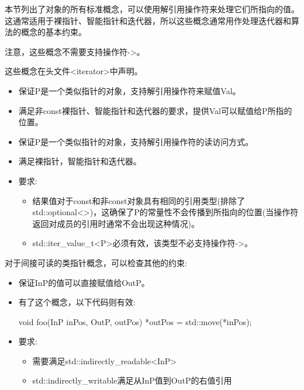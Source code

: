 
本节列出了对象的所有标准概念，可以使用解引用操作符来处理它们所指向的值。这通常适用于裸指针、智能指针和迭代器，所以这些概念通常用作处理迭代器和算法的概念的基本约束。

注意，这些概念不需要支持操作符->。

这些概念在头文件<iterator>中声明。



\begin{itemize}
\item
保证P是一个类似指针的对象，支持解引用操作符来赋值Val。

\item
满足非const裸指针、智能指针和迭代器的要求，提供Val可以赋值给P所指的位置。
\end{itemize}



\begin{itemize}
\item
保证P是一个类似指针的对象，支持解引用操作符的读访问方式。

\item
满足裸指针，智能指针和迭代器。


\item
要求:
\begin{itemize}
\item
结果值对于const和非const对象具有相同的引用类型(排除了std::optional<>)，这确保了P的常量性不会传播到所指向的位置(当操作符返回对成员的引用时通常不会出现这种情况)。

\item
std::iter\_value\_t<P>必须有效，该类型不必支持操作符->。
\end{itemize}
\end{itemize}


对于间接可读的类指针概念，可以检查其他的约束:


\begin{itemize}
\item
保证InP的值可以直接赋值给OutP。

\item
有了这个概念，以下代码则有效:

\begin{cpp}
void foo(InP inPos, OutP, outPos) {
	*outPos = std::move(*inPos);
}
\end{cpp}

\item
要求:
\begin{itemize}
\item
需要满足std::indirectly\_readable<InP>

\item
std::indirectly\_writable满足从InP值到OutP的右值引用
\end{itemize}
\end{itemize}

